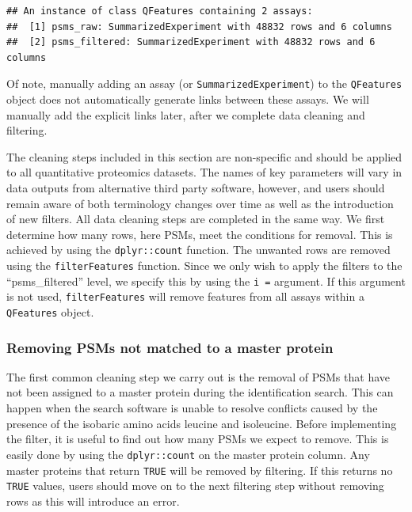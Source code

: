 \documentclass[9pt,a4paper,]{extarticle}
\begin{document}
\begin{verbatim}
## An instance of class QFeatures containing 2 assays:
##  [1] psms_raw: SummarizedExperiment with 48832 rows and 6 columns 
##  [2] psms_filtered: SummarizedExperiment with 48832 rows and 6 columns
\end{verbatim}

Of note, manually adding an assay (or \texttt{SummarizedExperiment}) to the \texttt{QFeatures}
object does not automatically generate links between these assays. We will
manually add the explicit links later, after we complete data cleaning and
filtering.

The cleaning steps included in this section are non-specific and should be applied
to all quantitative proteomics datasets. The names of key parameters will vary in
data outputs from alternative third party software, however, and users should
remain aware of both terminology changes over time as well as the introduction
of new filters. All data cleaning steps are completed in the same way. We first
determine how many rows, here PSMs, meet the conditions for removal. This is
achieved by using the \texttt{dplyr::count} function. The unwanted rows are removed
using the \texttt{filterFeatures} function. Since we only wish to apply the filters to
the ``psms\_filtered'' level, we specify this by using the \texttt{i\ =} argument. If this
argument is not used, \texttt{filterFeatures} will remove features from all assays
within a \texttt{QFeatures} object.

\hypertarget{removing-psms-not-matched-to-a-master-protein}{%
\subsubsection{Removing PSMs not matched to a master protein}\label{removing-psms-not-matched-to-a-master-protein}}

The first common cleaning step we carry out is the removal of PSMs that have not
been assigned to a master protein during the identification search. This can
happen when the search software is unable to resolve conflicts caused by the
presence of the isobaric amino acids leucine and isoleucine. Before implementing
the filter, it is useful to find out how many PSMs we expect to remove. This is
easily done by using the \texttt{dplyr::count} on the master protein column. Any master
proteins that return \texttt{TRUE} will be removed by filtering. If this returns
no \texttt{TRUE} values, users should move on to the next filtering step without
removing rows as this will introduce an error.
\end{document}
